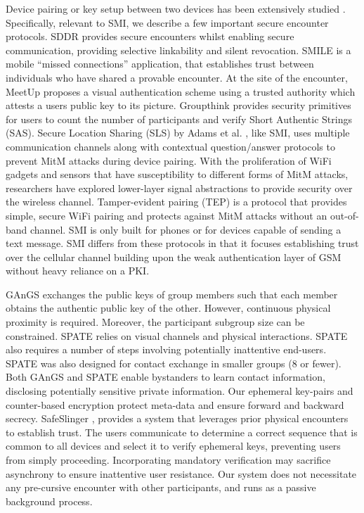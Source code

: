 \documentclass[letterpaper,twocolumn]{sig-alternate}
\begin{document}
Device pairing or key setup between two devices has been extensively studied
\cite{balfanz2002talking,castelluccia2005shake,bump,holmquist2001smart,lester2004you}. Specifically, relevant to SMI, we describe a few important secure encounter protocols. SDDR \cite{lentz2014sddr} provides secure encounters whilst enabling secure communication, providing selective linkability and silent revocation. SMILE \cite{smile} is a mobile “missed connections” application, that establishes trust between individuals who have shared a provable encounter. At the site of the encounter, MeetUp \cite{securesocial} proposes a visual authentication scheme using a trusted authority which attests a users public key to its picture. Groupthink \cite{groupthink} provides security primitives for users to count the number of participants and verify Short Authentic Strings (SAS). Secure Location Sharing (SLS) by Adams et al. \cite{clouds}, like SMI, uses multiple communication channels along with contextual question/answer protocols to prevent MitM attacks during device pairing. With the proliferation of WiFi gadgets and sensors that have susceptibility to different forms of MitM attacks, researchers have explored lower-layer signal abstractions to provide security over the wireless channel. Tamper-evident pairing (TEP) \cite{securepairing} is a protocol that provides simple, secure WiFi pairing and protects against MitM attacks without an out-of-band channel. SMI is only built for phones or for devices capable of sending a text message. SMI differs from these protocols in that it focuses establishing trust over the cellular channel building upon the weak authentication layer of GSM without heavy reliance on a PKI.

GAnGS \cite{gangs} exchanges the public keys of group members such that each member obtains the authentic public key of the other. However, continuous physical proximity is required. Moreover, the participant subgroup size can be constrained. SPATE \cite{spate} relies on visual channels and physical interactions. SPATE also requires a number of steps involving potentially inattentive end-users. SPATE was also designed for contact exchange in smaller groups (8 or fewer). Both GAnGS and SPATE enable bystanders to learn contact information, disclosing potentially sensitive private information. Our ephemeral key-pairs and counter-based encryption protect meta-data and ensure forward and backward secrecy. SafeSlinger \cite{safeslinger}, provides a system that leverages prior physical encounters to establish trust. The users communicate to determine a correct sequence that is common to all devices and select it to verify ephemeral keys, preventing users from simply proceeding. Incorporating mandatory verification may sacrifice asynchrony to ensure inattentive user resistance. Our system does not necessitate any pre-cursive encounter with other participants, and runs as a passive background process.
\end{document}
